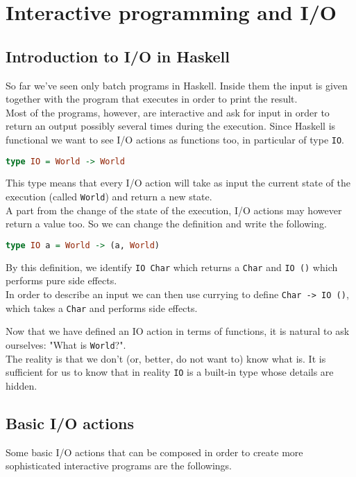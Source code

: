 \newpage
\chapter{Interactive programming and I/O}
\section{Introduction to I/O in Haskell}
So far we've seen only batch programs in Haskell. Inside them the input is given together with the program that executes in order to print the result. \\
Most of the programs, however, are interactive and ask for input in order to return an output possibly several times during the execution. Since Haskell is functional we want to see I/O actions as functions too, in particular of type \texttt{IO}.

\begin{lstlisting}[language=haskell]
type IO = World -> World
\end{lstlisting}

This type means that every I/O action will take as input the current state of the execution (called \texttt{World}) and return a new state. \\
A part from the change of the state of the execution, I/O actions may however return a value too. So we can change the definition and write the following.

\begin{lstlisting}[language=haskell]
type IO a = World -> (a, World) 
\end{lstlisting}

By this definition, we identify \texttt{IO Char} which returns a \texttt{Char} and \texttt{IO ()} which performs pure side effects. \\
In order to describe an input we can then use currying to define \texttt{Char -> IO ()}, which takes a \texttt{Char} and performs side effects.
\linebreak \linebreak

Now that we have defined an IO action in terms of functions, it is natural to ask ourselves: "What is \texttt{World}?". \\
The reality is that we don't (or, better, do not want to) know what is. It is sufficient for us to know that in reality \texttt{IO} is a built-in type whose details are hidden. 


\section{Basic I/O actions}
Some basic I/O actions that can be composed in order to create more sophisticated interactive programs are the followings.

